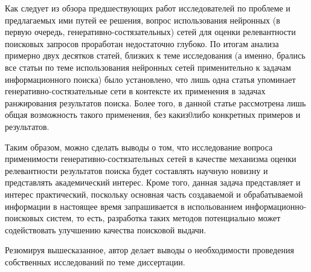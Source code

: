 Как следует из обзора предшествующих работ исследователей по проблеме 
и предлагаемых ими путей ее решения, вопрос использования нейронных (в первую очередь, 
генеративно-состязательных) сетей для оценки релевантности поисковых запросов проработан 
недостаточно глубоко. По итогам анализа примерно двух десятков статей, близких к 
теме исследования (а именно, брались все статьи по теме использования нейронных сетей
применительно к задачам информационного поиска) было установлено, что лишь одна статья
упоминает генеративно-состязательные сети в контексте их применения в задачах ранжирования
результатов поиска. Более того, в данной статье рассмотрена лишь общая возможность такого
применения, без какиз0либо конкретных примеров и результатов.

Таким образом, можно сделать выводы о том, что исследование вопроса применимости генеративно-состязательных
сетей в качестве механизма оценки релевантности результатов поиска будет составлять научную новизну
и представлять академический интерес. Кроме того, данная задача представляет и интерес практический,
поскольку основная часть создаваемой и обрабатываемой информации в настоящее время запрашивается
в испольованием информационно-поисковых систем, то есть, разработка таких методов потенциально
может содействовать улучшению качества поисковой выдачи.

Резюмируя вышесказанное, автор делает выводы о необходимости проведения собственных исследований
по теме диссертации.